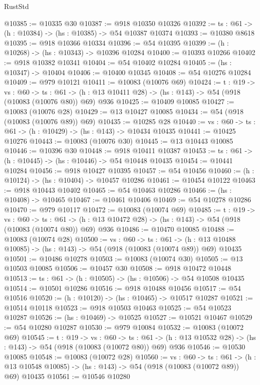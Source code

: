\begin{lexlean}{RustStd}
\begin{coremodule}
@10385 := @10335 @30
@10387 := @918 @10350 @10326
@10392 := {ts : @61} -> (h : @10384) -> (hs : @10385) -> @54 @10387 @10374
@10393 := @10380 @8618
@10395 := @918 @10366 @10334
@10396 := @54 @10395
@10399 := (h : @10268) -> (hs : @10343) -> @10396 @10284
@10400 := @10393 @10266
@10402 := @918 @10382 @10341
@10404 := @54 @10402 @10284
@10405 := (hs : @10347) -> @10404
@10406 := @10400 @10345
@10408 := @54 @10276 @10284
@10409 := @979 @10121
@10411 := @10083 (@10076 @69)
@10424 := {t : @19} ->
  {vs : @60} ->
  {ts : @61} -> (h : @13 @10411 @28) -> (hs : @143) -> @54 (@918 (@10083 (@10076 @80)) @69) @936
@10425 := @10409 @10085
@10427 := @10083 (@10076 @28)
@10429 := @13 @10427 @10085
@10434 := @54 (@918 (@10083 (@10076 @89)) @69)
@10435 := @10285 @28
@10440 := {vs : @60} -> {ts : @61} -> (h : @10429) -> (hs : @143) -> @10434 @10435
@10441 := @10425 @10276
@10443 := @10083 (@10076 @30)
@10445 := @13 @10443 @10085
@10446 := @10396 @30
@10448 := @918 @10411 @10387
@10453 := {ts : @61} -> (h : @10445) -> (hs : @10446) -> @54 @10448 @10435
@10454 := @10441 @10284
@10456 := @918 @10427 @10395
@10457 := @54 @10456
@10460 := (h : @10124) -> (hs : @10404) -> @10457 @10286
@10461 := @10454 @10122
@10463 := @918 @10443 @10402
@10465 := @54 @10463 @10286
@10466 := (hs : @10408) -> @10465
@10467 := @10461 @10406
@10469 := @54 @10278 @10286
@10470 := @979 @10117
@10472 := @10083 (@10074 @69)
@10485 := {t : @19} ->
  {vs : @60} ->
  {ts : @61} -> (h : @13 @10472 @28) -> (hs : @143) -> @54 (@918 (@10083 (@10074 @80)) @69) @936
@10486 := @10470 @10085
@10488 := @10083 (@10074 @28)
@10500 := {vs : @60} ->
  {ts : @61} ->
  (h : @13 @10488 @10085) -> (hs : @143) -> @54 (@918 (@10083 (@10074 @89)) @69) @10435
@10501 := @10486 @10278
@10503 := @10083 (@10074 @30)
@10505 := @13 @10503 @10085
@10506 := @10457 @30
@10508 := @918 @10472 @10448
@10513 := {ts : @61} -> (h : @10505) -> (hs : @10506) -> @54 @10508 @10435
@10514 := @10501 @10286
@10516 := @918 @10488 @10456
@10517 := @54 @10516
@10520 := (h : @10120) -> (hs : @10465) -> @10517 @10287
@10521 := @10514 @10118
@10523 := @918 @10503 @10463
@10525 := @54 @10523 @10287
@10526 := (hs : @10469) -> @10525
@10527 := @10521 @10467
@10529 := @54 @10280 @10287
@10530 := @979 @10084
@10532 := @10083 (@10072 @69)
@10545 := {t : @19} ->
  {vs : @60} ->
  {ts : @61} -> (h : @13 @10532 @28) -> (hs : @143) -> @54 (@918 (@10083 (@10072 @80)) @69) @936
@10546 := @10530 @10085
@10548 := @10083 (@10072 @28)
@10560 := {vs : @60} ->
  {ts : @61} ->
  (h : @13 @10548 @10085) -> (hs : @143) -> @54 (@918 (@10083 (@10072 @89)) @69) @10435
@10561 := @10546 @10280

\end{coremodule}
\end{lexlean}
